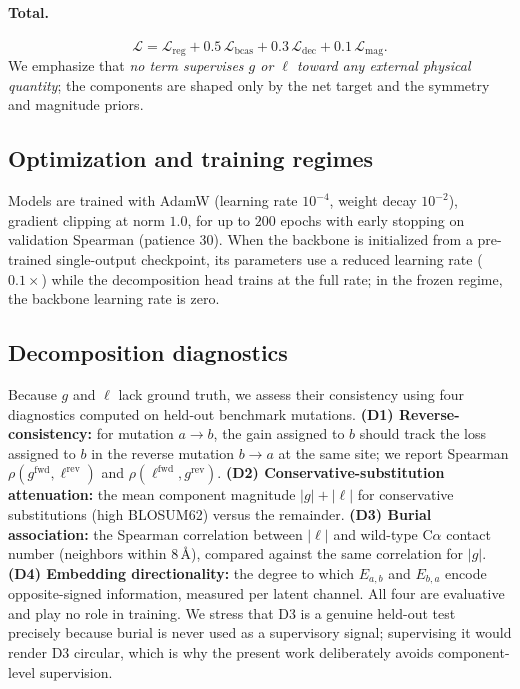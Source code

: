 \documentclass[11pt,a4paper]{article}
\theoremstyle{plain}
\theoremstyle{definition}
\begin{document}
\paragraph{Total.}
\begin{equation}
\mathcal{L} = \mathcal{L}_{\mathrm{reg}} + 0.5\,\mathcal{L}_{\mathrm{bcas}} + 0.3\,\mathcal{L}_{\mathrm{dec}} + 0.1\,\mathcal{L}_{\mathrm{mag}}.
\end{equation}
We emphasize that \emph{no term supervises $g$ or $\ell$ toward any external physical quantity}; the components are shaped only by the net target and the symmetry and magnitude priors.
\subsection{Optimization and training regimes}
\label{sec:optim}
Models are trained with AdamW (learning rate $10^{-4}$, weight decay $10^{-2}$), gradient clipping at norm $1.0$, for up to $200$ epochs with early stopping on validation Spearman (patience $30$). When the backbone is initialized from a pre-trained single-output checkpoint, its parameters use a reduced learning rate ($0.1\times$) while the decomposition head trains at the full rate; in the frozen regime, the backbone learning rate is zero.

\subsection{Decomposition diagnostics}
\label{sec:diagnostics}

Because $g$ and $\ell$ lack ground truth, we assess their consistency using four diagnostics computed on held-out benchmark mutations. \textbf{(D1) Reverse-consistency:} for mutation $a\!\rightarrow\!b$, the gain assigned to $b$ should track the loss assigned to $b$ in the reverse mutation $b\!\rightarrow\!a$ at the same site; we report Spearman $\rho(g^{\mathrm{fwd}}, \ell^{\mathrm{rev}})$ and $\rho(\ell^{\mathrm{fwd}}, g^{\mathrm{rev}})$.
\textbf{(D2) Conservative-substitution attenuation:} the mean component magnitude $|g| + |\ell|$ for conservative substitutions (high BLOSUM62) versus the remainder. \textbf{(D3) Burial association:} the Spearman correlation between $|\ell|$ and wild-type $\mathrm{C}\alpha$ contact number (neighbors within $8$\,\AA), compared against the same correlation for $|g|$. \textbf{(D4) Embedding directionality:} the degree to which $E_{a,b}$ and $E_{b,a}$ encode opposite-signed information, measured per latent channel. All four are evaluative and play no role in training. We stress that D3 is a genuine held-out test precisely because burial is never used as a supervisory signal; supervising it would render D3 circular, which is why the present work deliberately avoids component-level supervision.
\end{document}
